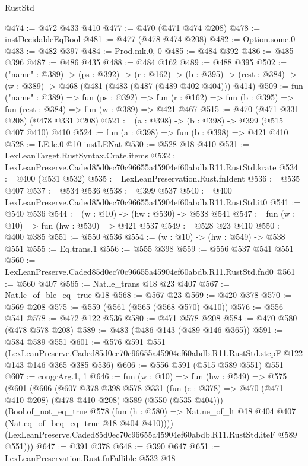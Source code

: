 \begin{lexlean}{RustStd}
\begin{coremodule}
@474 := @472 @433 @410
@477 := @470 (@471 @474 @208)
@478 := instDecidableEqBool
@481 := @477 (@478 @474 @208)
@482 := Option.some.{0}
@483 := @482 @397
@484 := Prod.mk.{0, 0}
@485 := @484 @392
@486 := @485 @396
@487 := @486 @435
@488 := @484 @162
@489 := @488 @395
@502 := ("name" : @389) ->
  (ps : @392) ->
  (r : @162) ->
  (b : @395) -> (rest : @384) -> (w : @389) -> @468 (@481 (@483 (@487 (@489 @402 @404))) @414)
@509 := fun ("name" : @389) =>
  fun (ps : @392) =>
  fun (r : @162) => fun (b : @395) => fun (rest : @384) => fun (w : @389) => @421 @467
@515 := @470 (@471 @331 @208) (@478 @331 @208)
@521 := (a : @398) -> (b : @398) -> @399 (@515 @407 @410) @410
@524 := fun (a : @398) => fun (b : @398) => @421 @410
@528 := LE.le.{0} @10 instLENat
@530 := @528 @18 @410
@531 := LexLeanTarget.RustSyntax.Crate.items
@532 := LexLeanPreserve.Caded85d0ec70c96655a45904ef60abdb.R11.RustStd.krate
@534 := @400 (@531 @532)
@535 := LexLeanPreservation.Rust.fnIdent
@536 := @535 @407
@537 := @534 @536
@538 := @399 @537
@540 := @400 LexLeanPreserve.Caded85d0ec70c96655a45904ef60abdb.R11.RustStd.it0
@541 := @540 @536
@544 := (w : @10) -> (hw : @530) -> @538 @541
@547 := fun (w : @10) => fun (hw : @530) => @421 @537
@549 := @528 @23 @410
@550 := @400 @385
@551 := @550 @536
@554 := (w : @10) -> (hw : @549) -> @538 @551
@555 := Eq.trans.{1}
@556 := @555 @398
@559 := @556 @537 @541 @551
@560 := LexLeanPreserve.Caded85d0ec70c96655a45904ef60abdb.R11.RustStd.fnd0
@561 := @560 @407
@565 := Nat.le_trans @18 @23 @407
@567 := Nat.le_of_ble_eq_true @18
@568 := @567 @23
@569 := @420 @378
@570 := @569 @208
@575 := @559 (@561 (@565 (@568 @570) @410))
@576 := @556 @541
@578 := @472 @122 @536
@580 := @471 @578 @208
@584 := @470 @580 (@478 @578 @208)
@589 := @483 (@486 @143 (@489 @146 @365))
@591 := @584 @589 @551
@601 := @576
    @591
    @551
    (LexLeanPreserve.Caded85d0ec70c96655a45904ef60abdb.R11.RustStd.stepF
      @122
      @143
      @146
      @365
      @385
      @536)
@606 := @556 @591 (@515 @589 @551) @551
@607 := congrArg.{1, 1}
@646 := fun (w : @10) =>
  fun (hw : @549) =>
  @575
    (@601
      (@606
        (@607
          @378
          @398
          @578
          @331
          (fun (c : @378) => @470 (@471 @410 @208) (@478 @410 @208) @589 (@550 (@535 @404)))
          (Bool.of_not_eq_true
            @578
            (fun (h : @580) => Nat.ne_of_lt @18 @404 @407 (Nat.eq_of_beq_eq_true @18 @404 @410))))
        (LexLeanPreserve.Caded85d0ec70c96655a45904ef60abdb.R11.RustStd.iteF @589 @551)))
@647 := @391 @378
@648 := @390 @647
@651 := LexLeanPreservation.Rust.fnFallible @532 @18

\end{coremodule}
\end{lexlean}
